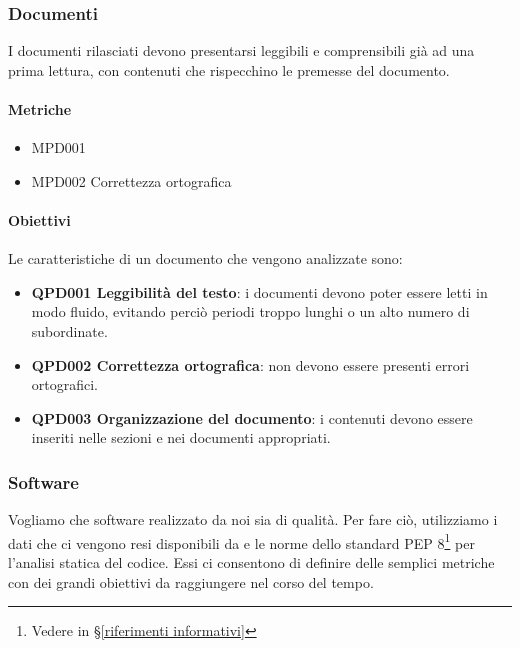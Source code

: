 	\subsubsection{Documenti}
	I documenti rilasciati devono presentarsi leggibili e comprensibili già ad una prima lettura, con contenuti che rispecchino le premesse del documento.

		\paragraph*{Metriche} 
		\begin{itemize}
			\item MPD001 
			\item MPD002 Correttezza ortografica
		\end{itemize} 
		
		\paragraph*{Obiettivi} 		
		Le caratteristiche di un documento che vengono analizzate sono:
		
		\begin{itemize}
			\item \textbf{QPD001 Leggibilità del testo}: i documenti devono poter essere letti in modo fluido, evitando perciò periodi troppo lunghi o un alto numero di subordinate.
			\item \textbf{QPD002 Correttezza ortografica}: non devono essere presenti errori ortografici.
			\item \textbf{QPD003 Organizzazione del documento}: i contenuti devono essere inseriti nelle sezioni e nei documenti appropriati.
		\end{itemize}

	\subsubsection{Software} \label{prodottosw}
	Vogliamo che software realizzato da noi sia di qualità.
	Per fare ciò, utilizziamo i dati che ci vengono resi disponibili da  e le norme dello standard PEP 8\footnote{Vedere in \S\ref{riferimenti informativi}} per l'analisi statica del codice.
	Essi ci consentono di definire delle semplici metriche con dei grandi obiettivi da raggiungere nel corso del tempo.

